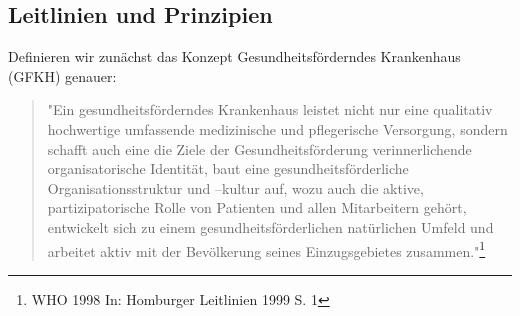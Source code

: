 \subsection{Leitlinien und Prinzipien}
\label{sec:LeitlinienUndPrinzipien}

Definieren wir zunächst das Konzept Gesundheitsförderndes Krankenhaus (GFKH) genauer: 

\begin{quotation}
"Ein gesundheitsförderndes Krankenhaus leistet nicht nur eine qualitativ hochwertige umfassende medizinische und pflegerische Versorgung, sondern schafft auch eine die Ziele der Gesundheitsförderung verinnerlichende organisatorische Identität, baut eine gesundheitsförderliche Organisationsstruktur und –kultur auf, wozu auch die aktive, partizipatorische Rolle von Patienten und allen Mitarbeitern gehört, entwickelt sich zu einem gesundheitsförderlichen natürlichen Umfeld und arbeitet aktiv mit der Bevölkerung seines Einzugsgebietes zusammen."\footnote{WHO 1998 In: Homburger Leitlinien 1999 S. 1}
\end{quotation}


